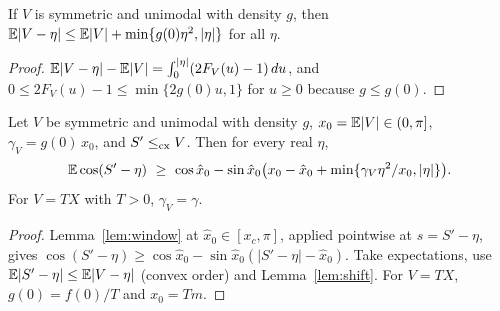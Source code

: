 \documentclass[11pt]{amsart}
\theoremstyle{definition}\newtheorem{definition}[theorem]{Definition}\theoremstyle{remark}\newtheorem{remark}[theorem]{Remark}
\begin{document}
\begin{lemma}\label{lem:shift}
If $V$ is symmetric and unimodal with density $g$, then $\mathbb E|V-\eta|\le\mathbb E|V|+\min\{g(0)\eta^2,|\eta|\}$ for all $\eta$.
\end{lemma}
\begin{proof}$\mathbb E|V-\eta|-\mathbb E|V|=\int_0^{|\eta|}(2F_V(u)-1)\,du$, and $0\le2F_V(u)-1\le\min\{2g(0)u,1\}$ for $u\ge0$ because $g\le g(0)$.\end{proof}
\begin{lemma}\label{lem:clamped}
Let $V$ be symmetric and unimodal with density $g$, $x_0=\mathbb E|V|\in(0,\pi]$, $\gamma_V=g(0)\,x_0$, and $S'\le_{\mathrm{cx}} V$. Then for every real $\eta$,
\[\mathbb E\cos(S'-\eta)\ \ge\ \cos\hat x_0-\sin\hat x_0\bigl(x_0-\hat x_0+\min\{\gamma_V\eta^2/x_0,|\eta|\}\bigr).\]
For $V=TX$ with $T>0$, $\gamma_V=\gamma$.
\end{lemma}
\begin{proof}Lemma~\ref{lem:window} at $\hat x_0\in[x_c,\pi]$, applied pointwise at $s=S'-\eta$, gives $\cos(S'-\eta)\ge\cos\hat x_0-\sin\hat x_0(|S'-\eta|-\hat x_0)$. Take expectations,
use $\mathbb E|S'-\eta|\le\mathbb E|V-\eta|$ (convex order) and Lemma~\ref{lem:shift}. For $V=TX$, $g(0)=f(0)/T$ and $x_0=Tm$.\end{proof}
\end{document}
